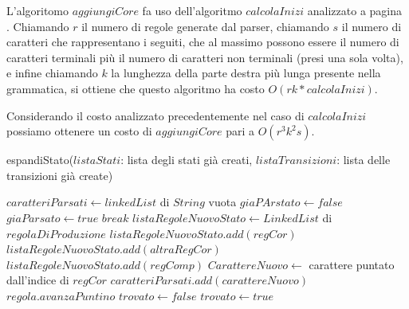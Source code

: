 \documentclass[12pt]{article}
\newcounter{subsubsubsection}[subsubsection]
\begin{document}
L'algoritomo $aggiungiCore$ fa uso dell'algoritmo $calcolaInizi$ analizzato a pagina \pageref{COSTOINIZI}. Chiamando $r$ il numero di regole generate dal parser, chiamando $s$ il numero di caratteri che rappresentano i seguiti, che al massimo possono essere il numero di caratteri terminali più il numero di caratteri non terminali (presi una sola volta), e infine chiamando $k$ la lunghezza della parte destra più lunga presente nella grammatica, si ottiene che questo algoritmo ha costo $O(rk*calcolaInizi)$.\par
Considerando il costo analizzato precedentemente nel caso di $calcolaInizi$ possiamo ottenere un costo di $aggiungiCore$ pari a $O(r^3k^2s)$.
\pagebreak
{}
\begin{algorithm}[H]
\caption{espandiStato($listaStati$: lista degli stati già creati, $listaTransizioni$: lista delle transizioni già create)}
\label{espandiStato}
\begin{algorithmic}[1]
\State $caratteriParsati \gets linkedList$ di $String$ vuota
\State $giaPArstato \gets false$
\State $giaParsato \gets true$
\State $break$
\EndIf
\EndFor
{} 
\State $listaRegoleNuovoStato \gets LinkedList$ di $regolaDiProduzione$ 
\State $listaRegoleNuovoStato.add(regCor)$
\State $listaRegoleNuovoStato.add(altraRegCor)$ 
\EndIf
\EndFor
{}
\State $listaRegoleNuovoStato.add(regComp)$
\EndIf
\EndFor
\EndIf
\State $CarattereNuovo \gets$ carattere puntato dall'indice di $regCor$
\State $caratteriParsati.add(carattereNuovo)$
\State $regola.avanzaPuntino$ 
\EndFor
\State $trovato \gets false$
\State $trovato \gets true$
\EndIf
\EndFor
{}
\end{algorithmic}
\end{algorithm}
\end{document}
